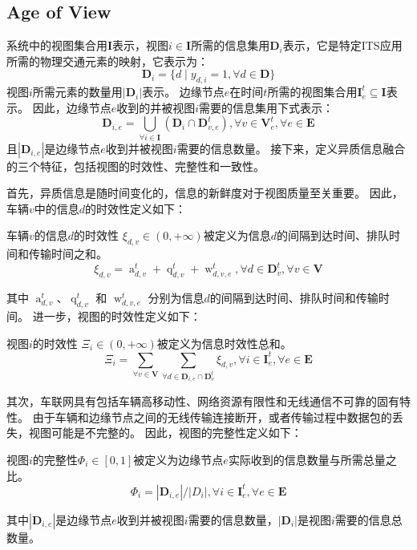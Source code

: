 \subsection{Age of View}
系统中的视图集合用$\mathbf{I}$表示，视图$i \in \mathbf{I}$所需的信息集用$\mathbf{D}_{i}$表示，它是特定ITS应用所需的物理交通元素的映射，它表示为：
\begin{equation}
	\mathbf{D}_{i} = \{d \mid y_{d, i} = 1, \forall d \in \mathbf{D} \}
\end{equation}
视图$i$所需元素的数量用$|\mathbf{D}_{i}|$表示。
边缘节点$e$在时间$t$所需的视图集合用$\mathbf{I}_e^t \subseteq \mathbf{I}$表示。
因此，边缘节点$e$收到的并被视图$i$需要的信息集用下式表示：
\begin{equation}
    \mathbf{D}_{i, e}=\bigcup_{\forall i \in \mathbf{I}}\left(\mathbf{D}_i \cap \mathbf{D}_{v, e}^t\right), \forall v \in \mathbf{V}_e^t, \forall e \in \mathbf{E}
\end{equation}
且$| \mathbf{D}_{i, e} |$是边缘节点$e$收到并被视图$i$需要的信息数量。
接下来，定义异质信息融合的三个特征，包括视图的时效性、完整性和一致性。

首先，异质信息是随时间变化的，信息的新鲜度对于视图质量至关重要。
因此，车辆$v$中的信息$d$的时效性定义如下：
\begin{definition}
	车辆$v$的信息$d$的时效性 $\xi_{d,v} \in (0, +\infty)$被定义为信息$d$的间隔到达时间、排队时间和传输时间之和。
	\begin{equation}
    	\xi_{d, v} = \operatorname{a}_{d, v}^t + \operatorname{q}_{d, v}^t + \operatorname{w}_{d, v, e}^t, \forall d \in \mathbf{D}_v^t, \forall v \in \mathbf{V}
	\end{equation}
\end{definition}
\noindent 其中 $\operatorname{a}_{d, v}^t$、$\operatorname{q}_{d, v}^t$ 和 $\operatorname{w}_{d, v, e}^t$ 分别为信息$d$的间隔到达时间、排队时间和传输时间。
进一步，视图的时效性定义如下：
\begin{definition}
视图$i$的时效性 $\Xi_{i} \in (0,+\infty)$被定义为信息时效性总和。
	\begin{equation}
    	\Xi_{i} = \sum_{\forall v \in \mathbf{V}} \sum_{\forall d \in \mathbf{D}_{i, e} \cap \mathbf{D}_v^t } \xi_{d, v}, \forall i \in \mathbf{I}_e^t, \forall e \in \mathbf{E}
	\end{equation}
\end{definition}

其次，车联网具有包括车辆高移动性、网络资源有限性和无线通信不可靠的固有特性。
由于车辆和边缘节点之间的无线传输连接断开，或者传输过程中数据包的丢失，视图可能是不完整的。
因此，视图的完整性定义如下：
\begin{definition}
	视图$i$的完整性$\Phi_{i} \in [0,1]$被定义为边缘节点$e$实际收到的信息数量与所需总量之比。
	\begin{equation}
	\Phi_{i}= {| \mathbf{D}_{i, e} |} \big/ {|D_{i} |}, \forall i \in \mathbf{I}_e^t, \forall e \in \mathbf{E}
	\end{equation}
\end{definition}
\noindent 其中$|\mathbf{D}_{i, e}|$是边缘节点$e$收到并被视图$i$需要的信息数量，$|\mathbf{D}_{i}|$是视图$i$需要的信息总数量。

